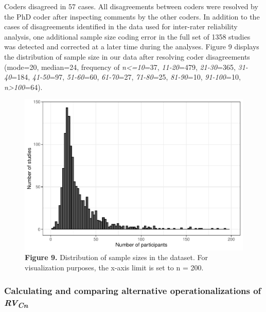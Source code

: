 \documentclass[
  man,floatsintext]{apa6}
\begin{document}
Coders disagreed in 57 cases. All disagreements between coders were resolved by the PhD coder after inspecting comments by the other coders. In addition to the cases of disagreements identified in the data used for inter-rater reliability analysis, one additional sample size coding error in the full set of 1358 studies was detected and corrected at a later time during the analyses. Figure 9 displays the distribution of sample size in our data after resolving coder disagreements (mode=20, median=24, frequency of \emph{n\textless=10}=37, \emph{11-20}=479, \emph{21-30}=365, \emph{31-40}=184, \emph{41-50}=97, \emph{51-60}=60, \emph{61-70}=27, \emph{71-80}=25, \emph{81-90}=10, \emph{91-100}=10, \emph{n\textgreater100}=64).

\begin{figure}
\centering
\includegraphics{RVcn_feasibility_in_social_neuroscience_cortex_files/figure-latex/fig9-1.pdf}
\caption{\label{fig:fig9}\textbf{Figure 9.} Distribution of sample sizes in the dataset. For visualization purposes, the x-axis limit is set to n = 200.}
\end{figure}

\hypertarget{calculating-and-comparing-alternative-operationalizations-of-rvcn}{%
\subsubsection{\texorpdfstring{Calculating and comparing alternative operationalizations of \emph{RV\textsubscript{Cn}}}{Calculating and comparing alternative operationalizations of RVCn}}\label{calculating-and-comparing-alternative-operationalizations-of-rvcn}}
\end{document}
